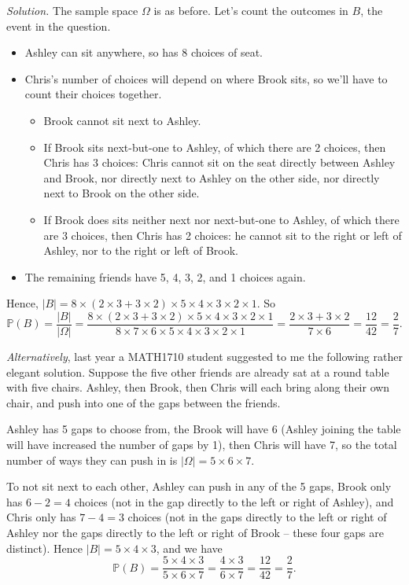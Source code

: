 \documentclass[
  a4paper,
]{book}
\providecommand{\tightlist}{%
  \setlength{\itemsep}{0pt}\setlength{\parskip}{0pt}}
\theoremstyle{definition}
\theoremstyle{definition}
\theoremstyle{definition}
\theoremstyle{definition}
\theoremstyle{remark}
\begin{document}
\begin{myanswers}
\emph{Solution.}
The sample space \(\Omega\) is as before. Let's count the outcomes in \(B\), the event in the question.

\begin{itemize}
\tightlist
\item
  Ashley can sit anywhere, so has 8 choices of seat.
\item
  Chris's number of choices will depend on where Brook sits, so we'll have to count their choices together.

  \begin{itemize}
  \tightlist
  \item
    Brook cannot sit next to Ashley.
  \item
    If Brook sits next-but-one to Ashley, of which there are 2 choices, then Chris has 3 choices: Chris cannot sit on the seat directly between Ashley and Brook, nor directly next to Ashley on the other side, nor directly next to Brook on the other side.
  \item
    If Brook does sits neither next nor next-but-one to Ashley, of which there are 3 choices, then Chris has 2 choices: he cannot sit to the right or left of Ashley, nor to the right or left of Brook.
  \end{itemize}
\item
  The remaining friends have 5, 4, 3, 2, and 1 choices again.
\end{itemize}

Hence, \(|B| = 8 \times (2\times 3 + 3 \times 2) \times 5 \times 4 \times 3 \times 2 \times 1\). So
\[ \mathbb P(B) = \frac{|B|}{|\Omega|} = \frac{8 \times (2\times 3 + 3 \times 2) \times 5 \times 4 \times 3 \times 2 \times 1}{8 \times 7 \times 6 \times 5 \times 4 \times 3 \times 2 \times 1} = \frac{2\times 3 + 3 \times 2}{7 \times 6} = \frac{12}{42} = \frac{2}{7} .  \]

\emph{Alternatively}, last year a MATH1710 student suggested to me the following rather elegant solution. Suppose the five other friends are already sat at a round table with five chairs. Ashley, then Brook, then Chris will each bring along their own chair, and push into one of the gaps between the friends.

Ashley has 5 gaps to choose from, the Brook will have 6 (Ashley joining the table will have increased the number of gaps by 1), then Chris will have 7, so the total number of ways they can push in is \(|\Omega| = 5 \times 6 \times 7\).

To not sit next to each other, Ashley can push in any of the 5 gaps, Brook only has \(6 - 2 = 4\) choices (not in the gap directly to the left or right of Ashley), and Chris only has \(7 - 4 = 3\) choices (not in the gaps directly to the left or right of Ashley nor the gaps directly to the left or right of Brook -- these four gaps are distinct). Hence \(|B| = 5 \times 4 \times 3\), and we have
\[ \mathbb P(B) = \frac{5 \times 4 \times 3}{5 \times 6 \times 7} = \frac{4 \times 3}{6 \times 7} = \frac{12}{42} = \frac{2}{7}.  \]

\end{myanswers}
\end{document}

